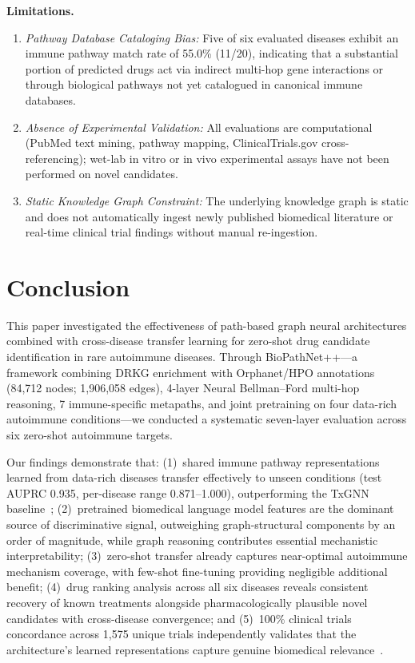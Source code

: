 \documentclass[conference]{IEEEtran}
\begin{document}
\textbf{Limitations.}
\begin{enumerate}
    \item \textit{Pathway Database Cataloging Bias:} Five of six evaluated diseases exhibit an immune pathway match rate of 55.0\% (11/20), indicating that a substantial portion of predicted drugs act via indirect multi-hop gene interactions or through biological pathways not yet catalogued in canonical immune databases.
    \item \textit{Absence of Experimental Validation:} All evaluations are computational (PubMed text mining, pathway mapping, ClinicalTrials.gov cross-referencing); wet-lab in vitro or in vivo experimental assays have not been performed on novel candidates.
    \item \textit{Static Knowledge Graph Constraint:} The underlying knowledge graph is static and does not automatically ingest newly published biomedical literature or real-time clinical trial findings without manual re-ingestion.
\end{enumerate}

\section{Conclusion}

This paper investigated the effectiveness of path-based graph neural architectures combined with cross-disease transfer learning for zero-shot drug candidate identification in rare autoimmune diseases. Through BioPathNet++---a framework combining DRKG enrichment with Orphanet/HPO annotations (84,712 nodes; 1,906,058 edges), 4-layer Neural Bellman--Ford multi-hop reasoning, 7 immune-specific metapaths, and joint pretraining on four data-rich autoimmune conditions---we conducted a systematic seven-layer evaluation across six zero-shot autoimmune targets.

Our findings demonstrate that: (1)~shared immune pathway representations learned from data-rich diseases transfer effectively to unseen conditions (test AUPRC 0.935, per-disease range 0.871--1.000), outperforming the TxGNN baseline~\cite{txgnn}; (2)~pretrained biomedical language model features are the dominant source of discriminative signal, outweighing graph-structural components by an order of magnitude, while graph reasoning contributes essential mechanistic interpretability; (3)~zero-shot transfer already captures near-optimal autoimmune mechanism coverage, with few-shot fine-tuning providing negligible additional benefit; (4)~drug ranking analysis across all six diseases reveals consistent recovery of known treatments alongside pharmacologically plausible novel candidates with cross-disease convergence; and (5)~100\% clinical trials concordance across 1,575 unique trials independently validates that the architecture's learned representations capture genuine biomedical relevance~\cite{clinicaltrials}.
\end{document}
